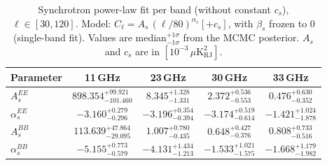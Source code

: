 \begin{table}[htbp]
\centering
\caption{Synchrotron power-law fit per band (without constant $c_s$), $\ell \in [30, 120]$. Model: $C_\ell = A_s\,(\ell/80)^{\alpha_s} [+ c_s]$, with $\beta_s$ frozen to 0 (single-band fit). Values are median$^{+1\sigma}_{-1\sigma}$ from the MCMC posterior. $A_s$ and $c_s$ are in $[10^{-3}\,\mu\mathrm{K}^2_\mathrm{RJ}]$.}
\label{tab:sync_single_band_noc_ell30-120}
\begin{tabular}{lcccc}
\toprule
Parameter & 11\,GHz & 23\,GHz & 30\,GHz & 33\,GHz \\
\midrule
$A_s^{EE}$ & $898.354^{+99.921}_{-101.460}$ & $8.345^{+1.328}_{-1.331}$ & $2.372^{+0.536}_{-0.553}$ & $0.476^{+0.630}_{-0.352}$ \\
$\alpha_s^{EE}$ & $-3.160^{+0.279}_{-0.296}$ & $-3.196^{+0.354}_{-0.394}$ & $-3.174^{+0.519}_{-0.614}$ & $-1.421^{+1.024}_{-1.878}$ \\
\midrule
$A_s^{BB}$ & $113.639^{+47.864}_{-29.095}$ & $1.007^{+0.780}_{-0.435}$ & $0.648^{+0.427}_{-0.376}$ & $0.808^{+0.733}_{-0.516}$ \\
$\alpha_s^{BB}$ & $-5.155^{+0.773}_{-0.579}$ & $-4.131^{+1.434}_{-1.213}$ & $-1.533^{+1.021}_{-1.575}$ & $-1.668^{+1.179}_{-1.982}$ \\
\bottomrule
\end{tabular}
\end{table}